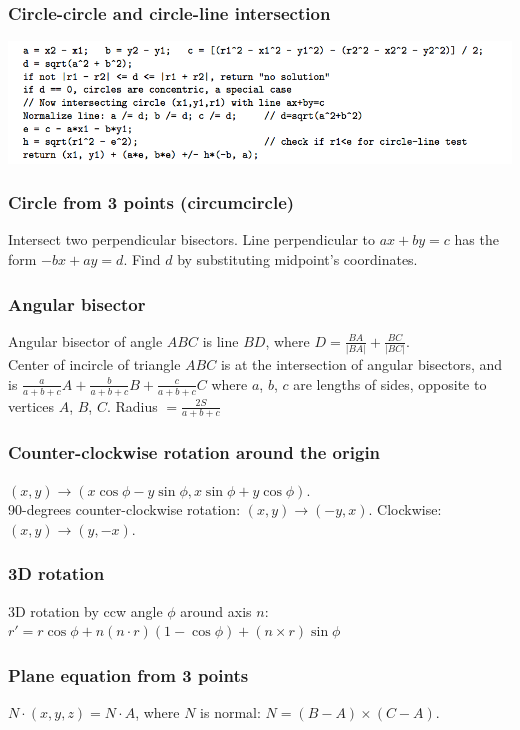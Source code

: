\documentclass[a4paper,13pt]{article}
\begin{document}
\subsubsection{Circle-circle and circle-line intersection}
 \includegraphics[scale=.7]{../lib/candc.png}

\subsubsection{Circle from 3 points (circumcircle)}
Intersect two perpendicular bisectors. Line perpendicular to $ax + by = c$ has the form $-bx + ay = d$. Find $d$ by substituting midpoint’s coordinates.

\subsubsection{Angular bisector}
Angular bisector of angle $ABC$ is line $BD$, where $D = \frac{BA}{|BA|} + \frac{BC}{|BC|}$.\\
Center of incircle of triangle $ABC$ is at the intersection of angular bisectors, and is $\frac{a}{a+b+c}A + \frac{b}{a+b+c}B + \frac{c}{a+b+c}C$
where $a$, $b$, $c$ are lengths of sides, opposite to vertices $A$, $B$, $C$. Radius $= \frac{2S}{a+b+c}$

\subsubsection{Counter-clockwise rotation around the origin}
$(x,y) \rightarrow (x\cos\phi - y\sin\phi, x \sin\phi + y \cos\phi)$.\\
90-degrees counter-clockwise rotation: $(x,y) \rightarrow (-y,x)$. Clockwise: $(x,y) \rightarrow (y,-x)$.

\subsubsection{3D rotation}
3D rotation by ccw angle $\phi$ around axis $n$: $r' = r \cos\phi + n(n \cdot r)(1 - \cos \phi) + (n \times r) \sin\phi$

\subsubsection{Plane equation from 3 points}
$N \cdot (x, y, z) = N \cdot A$, where $N$ is normal: $N = (B - A) \times (C - A)$.
\end{document}
